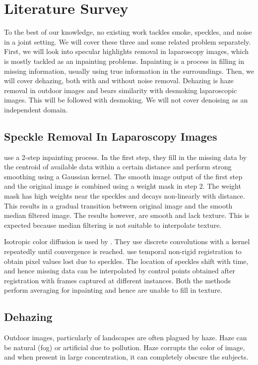 
\chapter{Literature Survey}

To the best of our knowledge, no existing work tackles smoke, speckles, and noise in a joint setting. We will cover these three and some related problem separately. First, we will look into specular highlights removal in laparoscopy images, which is mostly tackled as an inpainting problems. Inpainting is a process in filling in missing information, usually using true information in the surroundings. Then, we will cover dehazing, both with and without noise removal. Dehazing is haze removal in outdoor images and bears similarity with desmoking laparoscopic images. This will be followed with desmoking. We will not cover denoising as an independent domain.

\section{Speckle Removal In Laparoscopy Images}
\cite{arnold2010speckle} use a 2-step inpainting process. In the first step, they fill in the missing data by the centroid of available data within a certain distance and perform strong smoothing using a Gaussian kernel. The smooth image output of the first step and the original image is combined using a weight mask in step 2. The weight mask has high weights near the speckles and decays non-linearly with distance. This results in a gradual transition between original image and the smooth median filtered image. The results however, are smooth and lack texture. This is expected because median filtering is not suitable to interpolate texture.

Isotropic color diffusion is used by \cite{saint2011detection}. They use discrete convolutions with a kernel repeatedly until convergence is reached. \cite{stoyanov2005removing} use temporal non-rigid registration to obtain pixel values lost due to speckles. The location of speckles shift with time, and hence missing data can be interpolated by control points obtained after registration with frames captured at different instances. Both the methods perform averaging for inpainting and hence are unable to fill in texture.

\section{Dehazing}
Outdoor images, particularly of landscapes are often plagued by haze. Haze can be natural (fog) or artificial due to pollution. Haze corrupts the color of image, and when present in large concentration, it can completely obscure the subjects.

